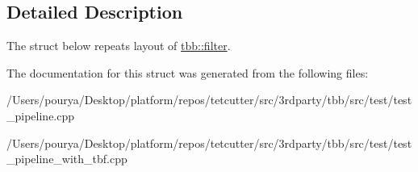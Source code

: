 \subsection{Detailed Description}
The struct below repeats layout of \hyperlink{classtbb_1_1filter}{tbb\+::filter}. 

The documentation for this struct was generated from the following files\+:\begin{DoxyCompactItemize}
\item 
/\+Users/pourya/\+Desktop/platform/repos/tetcutter/src/3rdparty/tbb/src/test/test\+\_\+pipeline.\+cpp\item 
/\+Users/pourya/\+Desktop/platform/repos/tetcutter/src/3rdparty/tbb/src/test/test\+\_\+pipeline\+\_\+with\+\_\+tbf.\+cpp\end{DoxyCompactItemize}
